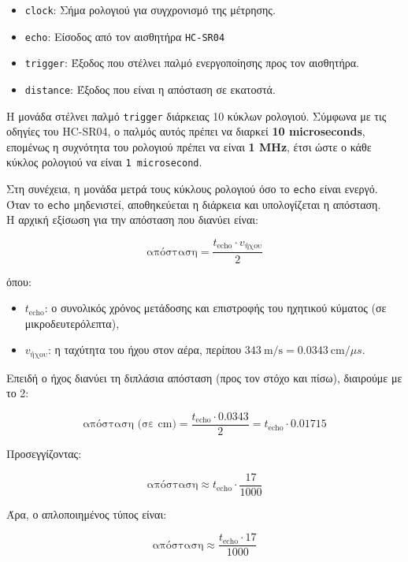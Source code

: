 \documentclass[conference]{IEEEtran}
\begin{document}
\begin{itemize}
    \item \texttt{clock}: Σήμα ρολογιού για συγχρονισμό της μέτρησης.
    \item \texttt{echo}: Είσοδος από τον αισθητήρα \texttt{HC-SR04}
    \item \texttt{trigger}: Έξοδος που στέλνει παλμό ενεργοποίησης προς τον αισθητήρα.
    \item \texttt{distance}: Έξοδος που είναι η απόσταση σε εκατοστά.
\end{itemize}

Η μονάδα στέλνει παλμό \texttt{trigger} διάρκειας 10 κύκλων ρολογιού. Σύμφωνα με τις οδηγίες του HC-SR04\cite{hcsr04}, ο παλμός αυτός πρέπει να διαρκεί \textbf{10 microseconds}, επομένως η συχνότητα του ρολογιού πρέπει να είναι \textbf{1 MHz}, έτσι ώστε ο κάθε κύκλος ρολογιού να είναι \texttt{1 microsecond}.

Στη συνέχεια, η μονάδα μετρά τους κύκλους ρολογιού όσο το \texttt{echo} είναι ενεργό. Όταν το \texttt{echo} μηδενιστεί, αποθηκεύεται η διάρκεια και υπολογίζεται η απόσταση. \\

Η αρχική εξίσωση για την απόσταση που διανύει είναι:

\[
\text{απόσταση} = \frac{t_{\text{echo}} \cdot v_{\text{ήχου}}}{2}
\]

όπου:
\begin{itemize}
    \item \( t_{\text{echo}} \): ο συνολικός χρόνος μετάδοσης και επιστροφής του ηχητικού κύματος (σε μικροδευτερόλεπτα),
    \item \( v_{\text{ήχου}} \): η ταχύτητα του ήχου στον αέρα, περίπου \(343\ \text{m/s} = 0.0343\ \text{cm}/\mu s\).
\end{itemize}

Επειδή ο ήχος διανύει τη διπλάσια απόσταση (προς τον στόχο και πίσω), διαιρούμε με το 2:

\[
\text{απόσταση (σε cm)} = \frac{t_{\text{echo}} \cdot 0.0343}{2}
= t_{\text{echo}} \cdot 0.01715
\]

Προσεγγίζοντας:

\[
\text{απόσταση} \approx t_{\text{echo}} \cdot \frac{17}{1000}
\]

Άρα, ο απλοποιημένος τύπος είναι:

\[
\text{απόσταση} \approx \frac{t_{\text{echo}} \cdot 17}{1000}
\]
\end{document}
